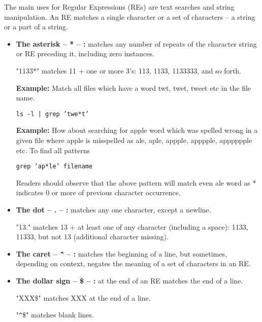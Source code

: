 \documentclass[a4paper,11pt,spanish]{article} %
\begin{document}
The main uses for Regular Expressions (REs) are text searches and string manipulation.
An RE matches a single character or a set of characters -- a string or a part of a string.


\begin{itemize}
 \item \textbf{The asterisk -- * -- :} matches any number of repeats of the character string or RE
 preceding it, including zero instances.
 
 "1133*" matches 11 + one or more 3's: 113, 1133, 1133333, and so forth.
 
 \textbf{Example:} Match all files which have a word twt, twet, tweet etc in the file name.

 \texttt{ls -l | grep 'twe*t'}

 \textbf{Example:} How about searching for apple word which was spelled wrong in a given file where apple 
 is misspelled as ale, aple, appple, apppple, apppppple etc. To find all patterns

 \texttt{grep 'ap*le' filename}

 Readers should observe that the above pattern will match even ale word as * indicates 
 0 or more of previous character occurrence.
 
 \item \textbf{The dot -- . -- :} matches any one character, except a newline.
 
 "13." matches 13 + at least one of any character (including a space): 1133, 11333, but not 13
 (additional character missing).
 
 \item \textbf{The caret -- \texttt{\^} -- :} matches the beginning of a line, but sometimes, depending on context,
 negates the meaning of a set of characters in an RE.
 
 \item \textbf{The dollar sign -- \$ -- :} at the end of an RE matches the end of a line.
 
 "XXX\$" matches XXX at the end of a line.

 "\texttt{\^}\$" matches blank lines. 
\end{itemize}

\cite{tldpre}
\end{document}
